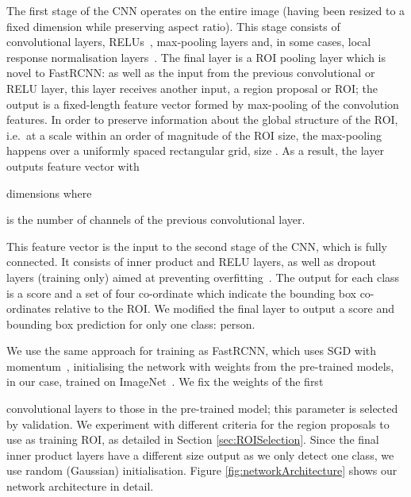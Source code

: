\documentclass[runningheads]{llncs}
\begin{document}
The first stage of the \ac{CNN} operates on the entire image (having been resized to a fixed dimension while preserving aspect ratio).
This stage consists of convolutional layers, \acp{RELU}~\cite{krizhevsky2012imagenet,nair2010rectified}, max-pooling layers and, in some cases, local response normalisation layers~\cite{krizhevsky2012imagenet}.
The final layer is a \ac{ROI} pooling layer which is novel to \ac{FastRCNN}: as well as the input from the previous convolutional or \ac{RELU} layer, this layer receives another input, a region proposal or \ac{ROI}; the  output is a fixed-length feature vector formed by max-pooling of the convolution features.
In order to preserve information about the global structure of the \ac{ROI}, i.e.\ at a scale within an order of magnitude of the \ac{ROI} size, the max-pooling happens over a uniformly spaced rectangular grid, size
.
As a result, the layer outputs feature vector with

dimensions where

is the number of channels of the previous convolutional layer.

This feature vector is the input to the second stage of the \ac{CNN}, which is fully connected.
It consists of inner product and \ac{RELU} layers, as well as dropout layers (training only) aimed at preventing overfitting~\cite{srivastava2014dropout}.
The output for each class is a score and a set of four co-ordinate which indicate the bounding box co-ordinates relative to the \ac{ROI}.
We modified the final layer to output a score and bounding box prediction for only one class: person.

We use the same approach for training as \ac{FastRCNN}, which uses \ac{SGD} with momentum~\cite{krizhevsky2012imagenet}, initialising the network with weights from the pre-trained models, in our case, trained on ImageNet~\cite{deng2009imagenet,krizhevsky2012imagenet}. 
We fix the weights of the first 

convolutional layers to those in the pre-trained model; this parameter is selected by validation.
We experiment with different criteria for the region proposals to use as training \ac{ROI}, as detailed in Section \ref{sec:ROISelection}.
Since the final inner product layers have a different size output as we only detect one class, we use random (Gaussian) initialisation.
Figure \ref{fig:networkArchitecture} shows our network architecture in detail.
\end{document}
